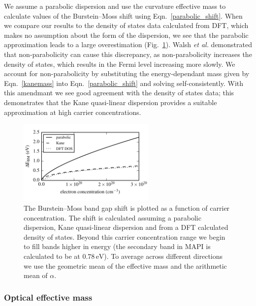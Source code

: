 We assume a parabolic dispersion and use the curvature effective mass to calculate values of the Burstein--Moss shift using Eqn.\ \ref{parabolic_shift}. When we compare our results to the density of states data calculated from DFT, which makes no assumption about the form of the dispersion, we see that the parabolic approximation leads to a large overestimation (Fig.\ \ref{burstein_moss_plot}). 
Walsh \textit{et al.}\autocite{Walsh2008} demonstrated that non-parabolicity can cause this discrepancy, as
non-parabolicity increases the density of states, which results in the Fermi level increasing more slowly. 
We account for non-parabolicity by substituting the energy-dependant mass given by Eqn.\ \ref{kanemass} into Eqn.\ \ref{parabolic_shift} and solving self-consistently.
With this amendmant we see good agreement with the density of states data; this demonstrates that the Kane quasi-linear dispersion provides a suitable approximation at high carrier concentrations.

\begin{figure}[tb] \centering
\includegraphics[width=0.6\textwidth]{./figures/ch4/burstein_moss_MAPI_hybrid_SoC.pdf}
\caption[Plot of Burstein--Moss band gap shift against carrier concentration]{\label{burstein_moss_plot} The Burstein--Moss band gap shift is plotted as a function of carrier concentration. The shift is calculated assuming a parabolic dispersion, Kane quasi-linear dispersion and from a DFT calculated density of states. Beyond this carrier concentration range we begin to fill bands higher in energy (the secondary band in MAPI is calculated to be at $0.78\,\mathrm{eV}$). To average across different directions we use the geometric mean of the effective mass and the arithmetic mean of $\alpha$.}
\end{figure}

\subsubsection{Optical effective mass}

